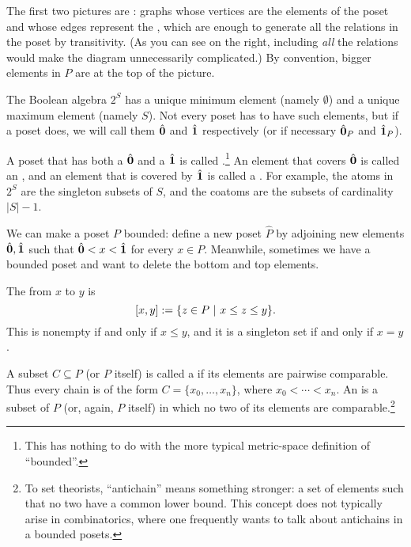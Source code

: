 The first two pictures are : graphs whose vertices are the elements of the poset
and whose edges represent the , which are enough to generate all the relations
in the poset by transitivity.  (As you can see on the right, including \emph{all} the relations would
make the diagram unnecessarily complicated.)  By convention, bigger elements in $P$ are at the top of the picture.

The Boolean algebra $2^S$ has a unique minimum element (namely $\emptyset$) and a
unique maximum element (namely $S$).  Not every poset has to have such elements,
but if a poset does, we will call them $\hat{\mathbf{0}}$ and $\hat{\mathbf{1}}$ respectively
(or if necessary $\hat{\mathbf{0}}_P$ and $\hat{\mathbf{1}}_P$).

\begin{definition}  A poset that has both a $\hat{\mathbf{0}}$ and a $\hat{\mathbf{1}}$ is called .\footnote{This has nothing to do with the more typical metric-space definition of ``bounded''.}  An element that covers $\hat{\mathbf{0}}$ is called an , and an element that is covered by $\hat{\mathbf{1}}$ is called a .  For example, the atoms in $2^S$ are the singleton subsets of $S$, and the coatoms are the subsets of cardinality $|S|-1$.
\end{definition}

We can make a poset $P$ bounded: define a new poset $\hat P$ by adjoining new elements $\hat{\mathbf{0}},\hat{\mathbf{1}}$ such that $\hat{\mathbf{0}}<x<\hat{\mathbf{1}}$ for every $x\in P$.  Meanwhile, sometimes we have a bounded poset and want to delete the bottom and top elements.

\begin{definition}
The  from $x$ to $y$ is
\[[x,y]:=\{z\in P~|~ x\leq z\leq y\}.\]
This is nonempty if and only if $x\leq y$, and it is a singleton set if and only if $x=y$.%
\end{definition}

\begin{definition} A subset $C\subseteq P$ (or $P$ itself) is called a  if its elements are pairwise comparable.
Thus every chain is of the form $C=\{x_0,\dots,x_n\}$, where $x_0<\cdots<x_n$.
An  is a subset of $P$ (or, again, $P$ itself) in which no two of its elements are comparable.\footnote{To set theorists, ``antichain'' means something stronger: a set of elements such that no two have a common lower bound.  This concept does not typically arise in combinatorics, where one frequently wants to talk about antichains in a bounded posets.}
\end{definition}

